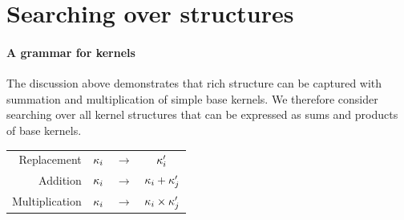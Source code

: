 \documentclass[twoside]{article}
\begin{document}


%

\section{Searching over structures}

\paragraph{A grammar for kernels}

The discussion above demonstrates that rich structure can be captured with summation and multiplication of simple base kernels.
We therefore consider searching over all kernel structures that can be expressed as sums and products of base kernels.

\begin{center}
\begin{tabular}{rccc}
\textrm{Replacement} & $\kappa_i$ & $\to$ & $\kappa'_i$\\%
\textrm{Addition} & $\kappa_i$ & $\to$ & $\kappa_i + \kappa'_j$\\%
\textrm{Multiplication} & $\kappa_i$ &  $\to$ & $\kappa_i \times \kappa'_j$\\%
\end{tabular}
\end{center}
\end{document}
